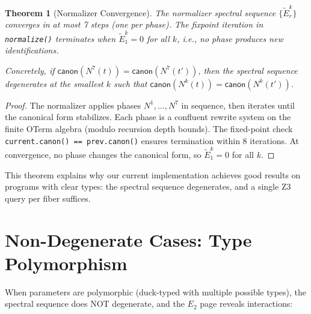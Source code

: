 \documentclass[11pt,a4paper]{report}
\theoremstyle{definition}
\theoremstyle{plain}
\newtheorem{theorem}[definition]{Theorem}
\begin{document}
\begin{theorem}[Normalizer Convergence]
\label{thm:normalizer-convergence}
The normalizer spectral sequence $\{\widetilde{E}_r^k\}$ converges
in at most 7 steps (one per phase).  The fixpoint iteration in
\texttt{normalize()} terminates when
$\widetilde{E}_1^k = 0$ for all $k$, i.e., no phase produces
new identifications.

Concretely, if $\mathsf{canon}(N^7(t)) = \mathsf{canon}(N^7(t'))$,
then the spectral sequence degenerates at the smallest $k$ such that
$\mathsf{canon}(N^k(t)) = \mathsf{canon}(N^k(t'))$.
\end{theorem}

\begin{proof}
The normalizer applies phases $N^1, \ldots, N^7$ in sequence, then
iterates until the canonical form stabilizes.  Each phase is a
confluent rewrite system on the finite OTerm algebra (modulo
recursion depth bounds).  The fixed-point check
\texttt{current.canon() == prev.canon()} ensures termination within
8 iterations.  At convergence, no phase changes the canonical form,
so $\widetilde{E}_1^k = 0$ for all $k$.
\end{proof}

This theorem explains why our current implementation achieves good
results on programs with clear types: the spectral sequence
degenerates, and a single Z3 query per fiber suffices.

\section{Non-Degenerate Cases: Type Polymorphism}

When parameters are polymorphic (duck-typed with multiple possible
types), the spectral sequence does NOT degenerate, and the $E_2$
page reveals interactions:
\end{document}
